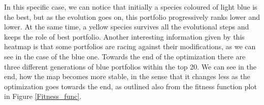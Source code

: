 In this specific case, we can notice that initially a species coloured of light blue is the best, but as the evolution goes on, this portfolio progressively ranks lower and lower. At the same time, a yellow species survives all the evolutional steps and keeps the role of best portfolio. Another interesting information given by this heatmap is that some portfolios are racing against their modifications, as we can see in the case of the blue one. Towards the end of the optimization there are three different generations of blue portfolios within the top 20. We can see in the end, how the map becomes more stable, in the sense that it changes less as the optimization goes towards the end, as outlined also from the fitness function plot in Figure \ref{Fitness_func}.